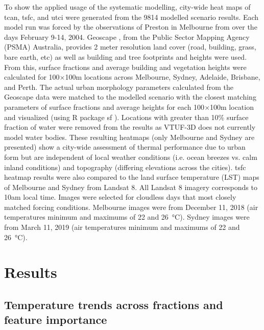 \documentclass[final,3p,times,authoryear]{elsarticle}
\begin{document}
To show the applied usage of the systematic modelling, city-wide heat maps of \gls{tcan}, \gls{tsfc}, and \gls{utci} were generated from the 9814 modelled scenario results. Each model run was forced by the observations of Preston in Melbourne from \cite{Coutts2007} over the days February 9-14, 2004. Geoscape \citep{Geoscape2020}, from the Public Sector Mapping Agency (PSMA) Australia, provides 2 meter resolution land cover (road, building, grass, bare earth, etc) as well as building and tree footprints and heights were used. From this, surface fractions and average building and vegetation heights were calculated for 100$\times$100m locations across Melbourne, Sydney, Adelaide, Brisbane, and Perth. The actual urban morphology parameters calculated from the Geoscape data were matched to the modelled scenario with the closest matching parameters of surface fractions and average heights for each 100$\times$100m location and visualized (using R package sf \citep{Pebesma2018}). Locations with greater than 10\% surface fraction of water were removed from the results as VTUF-3D does not currently model water bodies. These resulting heatmaps (only Melbourne and Sydney are presented) show a city-wide assessment of thermal performance due to urban form but are independent of local weather conditions (i.e. ocean breezes vs. calm inland conditions) and topography (differing elevations across the cities). \gls{tsfc} heatmap results were also compared to the land surface temperature (LST) maps of Melbourne and Sydney from Landsat 8. All Landsat 8 imagery corresponds to 10am local time. Images were selected for cloudless days that most closely matched forcing conditions. Melbourne images were from December 11, 2018  (air temperatures minimum and maximums of 22 and 26\SI{}{\degreeCelsius}). Sydney images were from March 11, 2019  (air temperatures minimum and maximums of 22 and 26\SI{}{\degreeCelsius}). 

\section{Results}\label{sec:results}

\subsection{Temperature trends across fractions and feature importance}\label{sec:resulttrends}
\end{document}
